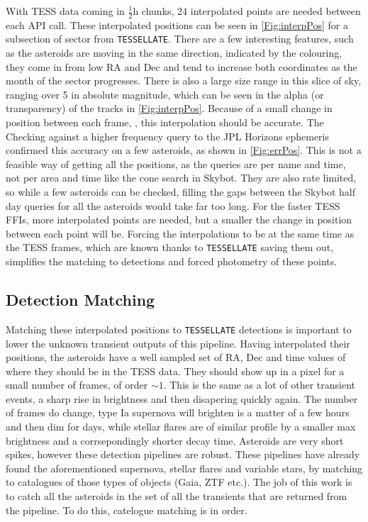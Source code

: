\documentclass{UCreport}
\begin{document}
With TESS data coming in $\frac12\unit{\hour}$ chunks, 24 interpolated points are needed between each API call.
These interpolated positions can be seen in \autoref{Fig:interpPos} for a subsection of sector from \texttt{TESSELLATE}.
There are a few interesting features, such as the asteroids are moving in the same direction, indicated by the colouring, they come in from low RA and Dec and tend to increase both coordinates as the month of the sector progresses.
There is also a large size range in this slice of sky, ranging over \qty{5}{\mag} in absolute magnitude, which can be seen in the alpha (or transparency) of the tracks in \autoref{Fig:interpPos}.
Because of a small change in position between each frame, \citep[$\sim \qty{1}{\px}$ per frame][]{Pal2018}, this interpolation should be accurate.
The
Checking against a higher frequency query to the JPL Horizons ephemeris  confirmed this accuracy on a few asteroids, as shown in \autoref{Fig:errPos}.
This is not a feasible way of getting all the positions, as the queries are per name and time, not per area and time like the cone search in Skybot.
They are also rate limited, so while a few asteroids can be checked, filling the gaps between the Skybot half day queries for all the asteroids would take far too long.
For the faster TESS FFIs, more interpolated points are needed, but a smaller the change in position between each point will be.
Forcing the interpolations to be at the same time as the TESS frames, which are known thanks to \texttt{TESSELLATE} saving them out, simplifies the matching to detections and forced photometry of these points.


\subsection{Detection Matching}\label{SubSec:Match}

Matching these interpolated positions to \texttt{TESSELLATE} detections is important to lower the unknown transient outputs of this pipeline.
Having interpolated their positions, the asteroids have a well sampled set of RA, Dec and time values of where they should be in the TESS data.
They should show up in a pixel for a small number of frames, of order $\sim1$.
This is the same as a lot of other transient events, a sharp rise in brightness and then disapering quickly again.
The number of frames do change, type Ia supernova will brighten is a matter of a few hours and then dim for days, while stellar flares are of similar profile by a smaller max brightness and a corrsepondingly shorter decay time.
Asteroids are very short spikes, however these detection pipelines are robust. %
These pipelines have already found the aforementioned supernova, stellar flares and variable stars, by matching to catalogues of those types of objects (Gaia, ZTF etc.).
The job of this work is to catch all the asteroids in the set of all the transients that are returned from the pipeline.
To do this, catelogue matching is in order.
\end{document}
